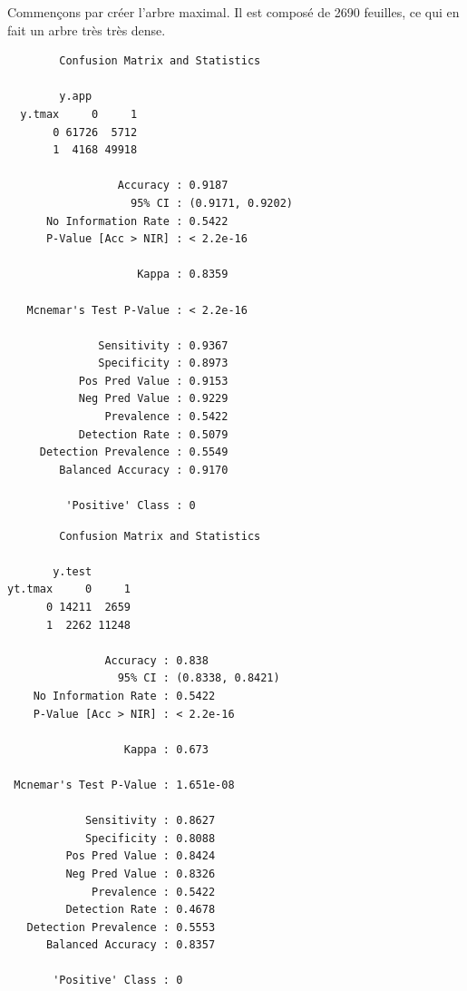 \documentclass{article}
\begin{document}
Commençons par créer l'arbre maximal. Il est composé de 2690 feuilles, ce qui en fait un arbre très très dense. 
\begin{multicols}{2}
    \begin{verbatim}
        Confusion Matrix and Statistics

        y.app
  y.tmax     0     1
       0 61726  5712
       1  4168 49918
                                            
                 Accuracy : 0.9187          
                   95% CI : (0.9171, 0.9202)
      No Information Rate : 0.5422          
      P-Value [Acc > NIR] : < 2.2e-16       
                                            
                    Kappa : 0.8359          
                                            
   Mcnemar's Test P-Value : < 2.2e-16       
                                            
              Sensitivity : 0.9367          
              Specificity : 0.8973          
           Pos Pred Value : 0.9153          
           Neg Pred Value : 0.9229          
               Prevalence : 0.5422          
           Detection Rate : 0.5079          
     Detection Prevalence : 0.5549          
        Balanced Accuracy : 0.9170          
                                            
         'Positive' Class : 0    
    \end{verbatim}
    \begin{verbatim}
        Confusion Matrix and Statistics

       y.test
yt.tmax     0     1
      0 14211  2659
      1  2262 11248
                                          
               Accuracy : 0.838           
                 95% CI : (0.8338, 0.8421)
    No Information Rate : 0.5422          
    P-Value [Acc > NIR] : < 2.2e-16       
                                          
                  Kappa : 0.673           
                                          
 Mcnemar's Test P-Value : 1.651e-08       
                                          
            Sensitivity : 0.8627          
            Specificity : 0.8088          
         Pos Pred Value : 0.8424          
         Neg Pred Value : 0.8326          
             Prevalence : 0.5422          
         Detection Rate : 0.4678          
   Detection Prevalence : 0.5553          
      Balanced Accuracy : 0.8357          
                                          
       'Positive' Class : 0               
                              
    \end{verbatim}
\end{multicols}
     
\end{document}
